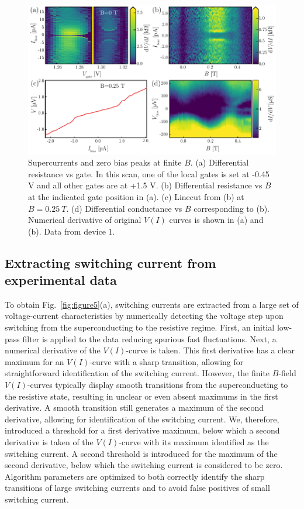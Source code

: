\begin{figure}
\begin{center}
\includegraphics[width=\columnwidth]{chapter_supercurrent/figures/sup_fig5}
\caption{Supercurrents and zero bias peaks at finite $B$.
(a) Differential resistance vs gate.
In this scan, one of the local gates is set at -0.45 V and all other gates are at +1.5 V.
(b) Differential resistance vs $B$ at the indicated gate position in (a).
(c) Linecut from (b) at $B = \SI{0.25}{T}$.
(d) Differential conductance vs $B$ corresponding to (b).
Numerical derivative of original $V\left(I\right)$ curves is shown in (a) and (b).
Data from device 1.}
\label{fig:supercurrentZBP}
\end{center}
\end{figure}

\subsection{Extracting switching current from experimental data}

To obtain Fig.~\ref{fig:figure5}(a), switching currents are extracted from a large set of voltage-current characteristics by numerically detecting the voltage step upon switching from the superconducting to the resistive regime.
First, an initial low-pass filter is applied to the data reducing spurious fast fluctuations.
Next, a numerical derivative of the $V\left(I\right)$-curve is taken.
This first derivative has a clear maximum for an $V\left(I\right)$-curve with a sharp transition, allowing for straightforward identification of the switching current.
However, the finite $B$-field $V\left(I\right)$-curves typically display smooth transitions from the superconducting to the resistive state, resulting in unclear or even absent maximums in the first derivative.
A smooth transition still generates a maximum of the second derivative, allowing for identification of the switching current.
We, therefore, introduced a threshold for a first derivative maximum, below which a second derivative is taken of the $V\left(I\right)$-curve with its maximum identified as the switching current.
A second threshold is introduced for the maximum of the second derivative, below which the switching current is considered to be zero.
Algorithm parameters are optimized to both correctly identify the sharp transitions of large switching currents and to avoid false positives of small switching current.


